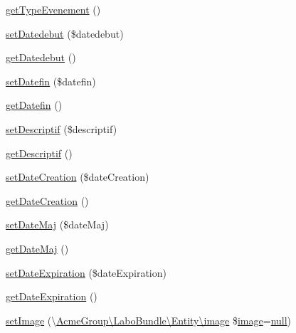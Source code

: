 \begin{DoxyCompactItemize}
\item 
\hyperlink{class_acme_group_1_1_labo_bundle_1_1_entity_1_1evenement_aed44148a191988ef255ea3c18d9fa3bd}{get\+Type\+Evenement} ()
\item 
\hyperlink{class_acme_group_1_1_labo_bundle_1_1_entity_1_1evenement_ac8c2afbd220ad924ac495bba6c8b42af}{set\+Datedebut} (\$datedebut)
\item 
\hyperlink{class_acme_group_1_1_labo_bundle_1_1_entity_1_1evenement_a99ca9b6eb40babb0ecc04c9d8427984f}{get\+Datedebut} ()
\item 
\hyperlink{class_acme_group_1_1_labo_bundle_1_1_entity_1_1evenement_a481e4ef8d6059b72584d1ecbcbed5c0c}{set\+Datefin} (\$datefin)
\item 
\hyperlink{class_acme_group_1_1_labo_bundle_1_1_entity_1_1evenement_ac19a9b370aaa44277bc066e8170167ae}{get\+Datefin} ()
\item 
\hyperlink{class_acme_group_1_1_labo_bundle_1_1_entity_1_1evenement_a82229d2ca1294e313f481cdb787322fb}{set\+Descriptif} (\$descriptif)
\item 
\hyperlink{class_acme_group_1_1_labo_bundle_1_1_entity_1_1evenement_a44d37e3c0034502d8c642ccdfb2a367e}{get\+Descriptif} ()
\item 
\hyperlink{class_acme_group_1_1_labo_bundle_1_1_entity_1_1evenement_ac6b057c2f2e126dbaf9fdd45b3c552e1}{set\+Date\+Creation} (\$date\+Creation)
\item 
\hyperlink{class_acme_group_1_1_labo_bundle_1_1_entity_1_1evenement_a63a5713a874069ba889d09b91d595c44}{get\+Date\+Creation} ()
\item 
\hyperlink{class_acme_group_1_1_labo_bundle_1_1_entity_1_1evenement_a90fc3911ced499c06ef6b8e8cc7224b9}{set\+Date\+Maj} (\$date\+Maj)
\item 
\hyperlink{class_acme_group_1_1_labo_bundle_1_1_entity_1_1evenement_af9117178292a3574f9b7cc3182d9109d}{get\+Date\+Maj} ()
\item 
\hyperlink{class_acme_group_1_1_labo_bundle_1_1_entity_1_1evenement_a368570438768dbdbd9e70d295d5abd6a}{set\+Date\+Expiration} (\$date\+Expiration)
\item 
\hyperlink{class_acme_group_1_1_labo_bundle_1_1_entity_1_1evenement_aa3476be50220b8d2d678b61e5d7168be}{get\+Date\+Expiration} ()
\item 
\hyperlink{class_acme_group_1_1_labo_bundle_1_1_entity_1_1evenement_a975cb026027bccccd94d9fa141c99c5b}{set\+Image} (\textbackslash{}\hyperlink{class_acme_group_1_1_labo_bundle_1_1_entity_1_1image}{Acme\+Group\textbackslash{}\+Labo\+Bundle\textbackslash{}\+Entity\textbackslash{}image} \$\hyperlink{class_acme_group_1_1_labo_bundle_1_1_entity_1_1image}{image}=\hyperlink{validate_8js_afb8e110345c45e74478894341ab6b28e}{null})

\end{DoxyCompactItemize}
